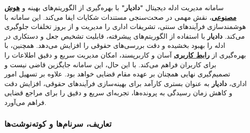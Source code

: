 \documentclass[12pt,a4paper,oneside]{article}
\begin{document}
			سامانه مدیریت ادله دیجیتال \textbf{"دادیار"} با بهره‌گیری از الگوریتم‌های بهینه و \hyperref[ref:ai]{\textbf{هوش مصنوعی}}، نقش مهمی در صحت‌سنجی مستندات شکایات ایفا می‌کند. این سامانه با هوشمند\-سازی فرآیندهای سنتی، تشریفات اداری را مدیریت و از بروز تخلفات جلوگیری می‌کند.  
			\textbf{دادیار} با استفاده از الگوریتم‌های پیشرفته، قابلیت تشخیص جعل و دستکاری در ادله را بهبود بخشیده و دقت بررسی‌های حقوقی را افزایش می‌دهد. همچنین، با بهره‌گیری از \hyperref[ref:gui]{\textbf{رابط کاربری}} آسان و کاربرپسند، امکان مدیریت سریع و دقیق‌ اطلاعات را برای کاربران فراهم می‌کند. با این حال، این سامانه جایگزین قاضی نیست و تصمیم‌گیری نهایی همچنان بر عهده مقام قضایی خواهد بود.  
			علاوه بر تسهیل امور اداری، \textbf{دادیار} به عنوان بستری کارآمد برای بهینه‌سازی فرآیندهای حقوقی، افزایش دقت و کاهش زمان رسیدگی به پرونده‌ها، تجربه‌ای سریع‌ و دقیق‌ را برای مراجع قضایی فراهم می‌آورد.

			\subsubsection{تعاریف، سرنام‌ها و کوته‌نوشت‌ها}
\end{document}
